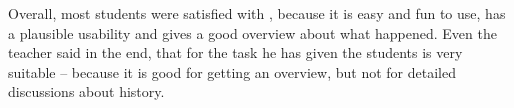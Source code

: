 
Overall, most students were satisfied with \HG, because it is easy and fun to use, has a plausible usability and gives a good overview about what happened. Even the teacher said in the end, that for the task he has given the students \HG is very suitable -- because it is good for getting an overview, but not for detailed discussions about history.

